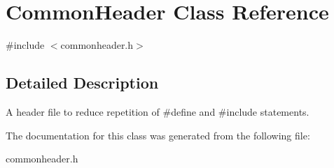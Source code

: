 \hypertarget{classCommonHeader}{}\section{Common\+Header Class Reference}
\label{classCommonHeader}


{\ttfamily \#include $<$commonheader.\+h$>$}



\subsection{Detailed Description}
A header file to reduce repetition of \#define and \#include statements. 

The documentation for this class was generated from the following file\+:\begin{DoxyCompactItemize}
\item 
commonheader.\+h\end{DoxyCompactItemize}
